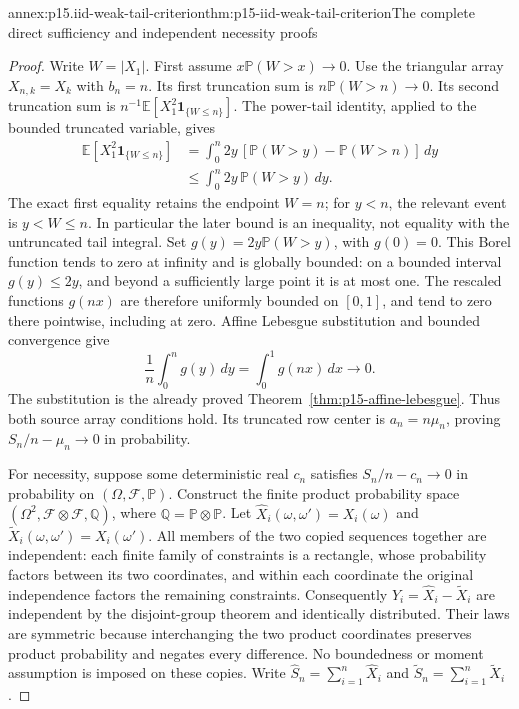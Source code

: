 \begin{annexitem}{annex:p15.iid-weak-tail-criterion}{thm:p15-iid-weak-tail-criterion}{The complete direct sufficiency and independent necessity proofs}
\begin{proof}
Write \(W=|X_1|\). First assume \(x\mathbb P(W>x)\to0\).
Use the triangular array \(X_{n,k}=X_k\) with \(b_n=n\).
Its first truncation sum is \(n\mathbb P(W>n)\to0\).
Its second truncation sum is
\(n^{-1}\mathbb E[X_1^2\mathbf1_{\{W\leq n\}}]\).
The power-tail identity, applied to the bounded truncated variable,
gives
\[
 \begin{aligned}
 \mathbb E[X_1^2\mathbf1_{\{W\leq n\}}]
 &=\int_0^n2y\,[\mathbb P(W>y)-\mathbb P(W>n)]\,dy\\
 &\leq\int_0^n2y\,\mathbb P(W>y)\,dy .
 \end{aligned}
\]
The exact first equality retains the endpoint \(W=n\);
for \(y<n\), the relevant event is \(y<W\leq n\).
In particular the later bound is an inequality, not equality with
the untruncated tail integral.
Set \(g(y)=2y\mathbb P(W>y)\), with \(g(0)=0\).
This Borel function tends to zero at infinity and is globally bounded:
on a bounded interval \(g(y)\leq2y\), and beyond a sufficiently
large point it is at most one. The rescaled functions \(g(nx)\)
are therefore uniformly bounded on \([0,1]\), and tend to zero
there pointwise, including at zero. Affine Lebesgue substitution
and bounded convergence give
\[
 \frac1n\int_0^n g(y)\,dy=\int_0^1g(nx)\,dx\longrightarrow0.
\]
The substitution is the already proved
Theorem~\ref{thm:p15-affine-lebesgue}.
Thus both source array conditions hold. Its truncated row center
is \(a_n=n\mu_n\), proving \(S_n/n-\mu_n\to0\) in probability.

For necessity, suppose some deterministic real \(c_n\) satisfies
\(S_n/n-c_n\to0\) in probability on \((\Omega,\mathcal F,\mathbb P)\).
Construct the finite product probability space
\((\Omega^2,\mathcal F\otimes\mathcal F,\mathbb Q)\), where
\(\mathbb Q=\mathbb P\otimes\mathbb P\). Let
\(\widehat X_i(\omega,\omega')=X_i(\omega)\) and
\(\widetilde X_i(\omega,\omega')=X_i(\omega')\).
All members of the two copied sequences together are independent:
each finite family of constraints is a rectangle, whose probability
factors between its two coordinates, and within each coordinate the
original independence factors the remaining constraints.
Consequently \(Y_i=\widehat X_i-\widetilde X_i\) are independent
by the disjoint-group theorem and identically distributed.
Their laws are symmetric because interchanging the two product
coordinates preserves product probability and negates every difference.
No boundedness or moment assumption is imposed on these copies.
Write \(\widehat S_n=\sum_{i=1}^n\widehat X_i\) and
\(\widetilde S_n=\sum_{i=1}^n\widetilde X_i\).


\end{proof}
\end{annexitem}

